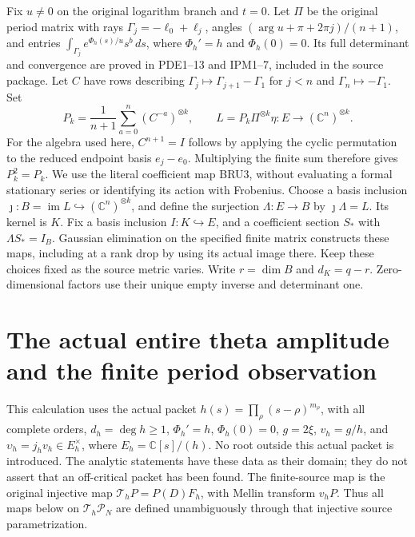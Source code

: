 \documentclass[11pt,a4paper]{article}
\begin{document}
Fix $u\ne0$ on the original logarithm branch and $t=0$. Let
$\Pi$ be the original period matrix with rays
$\Gamma_j=-\ell_0+\ell_j$, angles
$(\arg u+\pi+2\pi j)/(n+1)$, and entries
$\int_{\Gamma_j}e^{\Phi_h(s)/u}s^b\,ds$, where $\Phi_h'=h$ and
$\Phi_h(0)=0$. Its full determinant and convergence are proved in
PDE1--13 and IPM1--7, included in the source package. Let $C$ have
rows describing $\Gamma_j\mapsto\Gamma_{j+1}-\Gamma_1$ for $j<n$
and $\Gamma_n\mapsto-\Gamma_1$. Set
\[
 P_k=\frac1{n+1}\sum_{a=0}^{n}(C^{-a})^{\otimes k},\qquad
 L=P_k\Pi^{\otimes k}\eta:E\longrightarrow(\mathbb{C}^n)^{\otimes k}.
 \tag{BRU3}
\]
For the algebra used here, $C^{n+1}=I$ follows by applying the
cyclic permutation to the reduced endpoint basis $e_j-e_0$.
Multiplying the finite sum therefore gives $P_k^2=P_k$.
We use the literal coefficient map BRU3, without evaluating a
formal stationary series or identifying its action with Frobenius.
Choose a basis inclusion $\jmath:B=\operatorname{im}L\hookrightarrow
(\mathbb{C}^n)^{\otimes k}$, and define the surjection
$\Lambda:E\to B$ by $\jmath\Lambda=L$. Its kernel is $K$.
Fix a basis inclusion $I:K\hookrightarrow E$, and a coefficient
section $S_*$ with $\Lambda S_*=I_B$. Gaussian elimination on the
specified finite matrix constructs these maps, including at a
rank drop by using its actual image there. Keep these choices fixed
as the source metric varies. Write $r=\dim B$ and $d_K=q-r$.
Zero-dimensional factors use their unique empty inverse and determinant one.




\section{The actual entire theta amplitude and the finite period observation}
\label{sec:ipm-entire-source}

This calculation uses the actual packet
\(h(s)=\prod_\rho(s-\rho)^{m_\rho}\), with all complete orders,
\(d_h=\deg h\ge1\), \(\Phi_h'=h\), \(\Phi_h(0)=0\),
\(g=2\xi\), \(v_h=g/h\), and
\(\upsilon_h=j_hv_h\in E_h^\times\), where
\(E_h=\mathbb C[s]/(h)\). No root outside this actual packet is
introduced. The analytic statements have these data as their domain;
they do not assert that an off-critical packet has been found.
The finite-source map is the original injective map
\(\mathcal T_hP=P(D)F_h\), with Mellin transform \(v_hP\).
Thus all maps below on \(\mathcal T_h\mathcal P_N\) are defined
unambiguously through that injective source parametrization.
\end{document}
